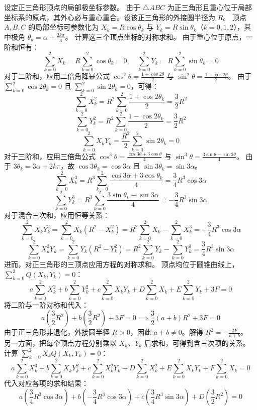 \begin{solution}
设定正三角形顶点的局部极坐标参数。
由于 $\triangle ABC$ 为正三角形且重心位于局部坐标系的原点，其外心必与重心重合。设该正三角形的外接圆半径为 $R$。
顶点 $A, B, C$ 的局部坐标可参数化为 $X_k = R\cos\theta_k$ 与 $Y_k = R\sin\theta_k$（$k = 0, 1, 2$），其中极角 $\theta_k = \alpha + \frac{2k\pi}{3}$。
计算这三个顶点坐标的对称求和。
由于重心位于原点，一阶和恒有：
$$ \sum_{k=0}^2 X_k = R\sum_{k=0}^2 \cos\theta_k = 0, \quad \sum_{k=0}^2 Y_k = R\sum_{k=0}^2 \sin\theta_k = 0 $$
对于二阶和，应用二倍角降幂公式 $\cos^2\theta = \frac{1+\cos 2\theta}{2}$ 与 $\sin^2\theta = \frac{1-\cos 2\theta}{2}$。
由于 $\sum_{k=0}^2 \cos 2\theta_k = 0$ 且 $\sum_{k=0}^2 \sin 2\theta_k = 0$，可得：
$$ \sum_{k=0}^2 X_k^2 = R^2\sum_{k=0}^2 \frac{1+\cos 2\theta_k}{2} = \frac{3}{2}R^2 $$
$$ \sum_{k=0}^2 Y_k^2 = R^2\sum_{k=0}^2 \frac{1-\cos 2\theta_k}{2} = \frac{3}{2}R^2 $$
$$ \sum_{k=0}^2 X_k Y_k = \frac{R^2}{2}\sum_{k=0}^2 \sin 2\theta_k = 0 $$
对于三阶和，应用三倍角公式 $\cos^3\theta = \frac{\cos 3\theta + 3\cos\theta}{4}$ 与 $\sin^3\theta = \frac{3\sin\theta - \sin 3\theta}{4}$。
由于 $3\theta_k = 3\alpha + 2k\pi$，故 $\cos 3\theta_k = \cos 3\alpha$ 且 $\sin 3\theta_k = \sin 3\alpha$。
$$ \sum_{k=0}^2 X_k^3 = R^3\sum_{k=0}^2 \frac{\cos 3\alpha + 3\cos\theta_k}{4} = \frac{3}{4}R^3 \cos 3\alpha $$
$$ \sum_{k=0}^2 Y_k^3 = R^3\sum_{k=0}^2 \frac{3\sin\theta_k - \sin 3\alpha}{4} = -\frac{3}{4}R^3 \sin 3\alpha $$
对于混合三次和，应用恒等关系：
$$ \sum_{k=0}^2 X_k Y_k^2 = \sum_{k=0}^2 X_k(R^2 - X_k^2) = R^2\sum_{k=0}^2 X_k - \sum_{k=0}^2 X_k^3 = -\frac{3}{4}R^3 \cos 3\alpha $$
$$ \sum_{k=0}^2 X_k^2 Y_k = \sum_{k=0}^2 Y_k(R^2 - Y_k^2) = R^2\sum_{k=0}^2 Y_k - \sum_{k=0}^2 Y_k^3 = \frac{3}{4}R^3 \sin 3\alpha $$
进而，对正三角形的三顶点应用方程的对称求和。
顶点均位于圆锥曲线上， $\sum_{k=0}^2 Q(X_k, Y_k) = 0$：
$$ a\sum_{k=0}^2 X_k^2 + b\sum_{k=0}^2 Y_k^2 + c\sum_{k=0}^2 X_k Y_k + D\sum_{k=0}^2 X_k + E\sum_{k=0}^2 Y_k + 3F = 0 $$
将二阶与一阶对称和代入：
$$ a\left(\frac{3}{2}R^2\right) + b\left(\frac{3}{2}R^2\right) + 3F = 0 \implies \frac{3}{2}(a+b)R^2 + 3F = 0 $$
由于正三角形非退化，外接圆半径 $R > 0$，因此 $a+b \neq 0$。解得 $R^2 = -\frac{2F}{a+b}$。\\
另一方面，把每个顶点方程分别乘以 $X_k$、$Y_k$ 后求和，可得到含三次项的关系。
计算 $\sum_{k=0}^2 X_k Q(X_k, Y_k) = 0$：
$$ a\sum_{k=0}^2 X_k^3 + b\sum_{k=0}^2 X_k Y_k^2 + c\sum_{k=0}^2 X_k^2 Y_k + D\sum_{k=0}^2 X_k^2 + E\sum_{k=0}^2 X_k Y_k + F\sum_{k=0}^2 X_k = 0 $$
代入对应各项的求和结果：
$$ a\left(\frac{3}{4}R^3 \cos 3\alpha\right) + b\left(-\frac{3}{4}R^3 \cos 3\alpha\right) + c\left(\frac{3}{4}R^3 \sin 3\alpha\right) + D\left(\frac{3}{2}R^2\right) = 0 $$

\end{solution}
